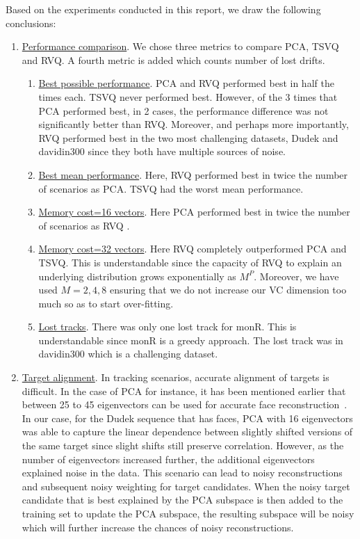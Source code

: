 Based on the experiments conducted in this report, we draw the following conclusions:

\begin{enumerate}
\item \underline{Performance comparison}.  We chose three metrics to compare PCA, TSVQ and RVQ.  A fourth metric is added which counts number of lost drifts.
\begin{enumerate}
\item \underline{Best possible performance}.  PCA and RVQ performed best in half the times each.  TSVQ never performed best.  However, of the 3 times that PCA performed best, in 2 cases, the performance difference was not significantly better than RVQ.  Moreover, and perhaps more importantly, RVQ performed best in the two most challenging datasets, Dudek and davidin300 since they both have multiple sources of noise.
\item \underline{Best mean performance}.  Here, RVQ performed best in twice the number of scenarios as PCA.  TSVQ had the worst mean performance.
\item \underline{Memory cost=16 vectors}.  Here PCA performed best in twice the number of scenarios as RVQ .
\item \underline{Memory cost=32 vectors}.  Here RVQ completely outperformed PCA and TSVQ.  This is understandable since the capacity of RVQ to explain an underlying distribution grows exponentially as $M^P$.  Moreover, we have used $M=2, 4, 8$ ensuring that we do not increase our VC dimension too much so as to start over-fitting.
\item \underline{Lost tracks}.  There was only one lost track for monR.  This is understandable since monR is a greedy approach.  The lost track was in davidin300 which is a challenging dataset.
\end{enumerate}

\item \underline{Target alignment}.  In tracking scenarios, accurate alignment of targets is difficult.  In the case of PCA for instance, it has been mentioned earlier that between 25 to 45 eigenvectors can be used for accurate face reconstruction~\cite{1997_JNL_EigenVsFisherFaces_Bel}.  In our case, for the Dudek sequence that has faces, PCA with 16 eigenvectors was able to capture the linear dependence between slightly shifted versions of the same target since slight shifts still preserve correlation.  However, as the number of eigenvectors increased further, the additional eigenvectors explained noise in the data.  This scenario can lead to noisy reconstructions and subsequent noisy weighting for target candidates.  When the noisy target candidate that is best explained by the PCA subspace is then added to the training set to update the PCA subspace, the resulting subspace will be noisy which will further increase the chances of noisy reconstructions.  
\end{enumerate}

